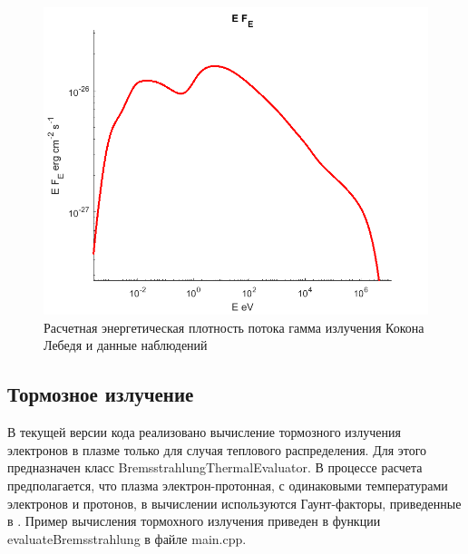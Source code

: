 \begin{figure}
	\centering
	\includegraphics[width=12.5 cm]{./fig/compton.png} 
	\caption{Расчетная энергетическая плотность потока гамма излучения Кокона Лебедя и данные наблюдений}
	\label{pion}
\end{figure}
\subsection{Тормозное излучение}
В текущей версии кода реализовано вычисление тормозного излучения электронов в плазме только для случая теплового распределения. Для этого предназначен класс BremsstrahlungThermalEvaluator. В процессе расчета предполагается, что плазма электрон-протонная, с одинаковыми температурами электронов и протонов, в вычислении используются Гаунт-факторы, приведенные в \cite{Rybicki}. Пример вычисления тормохного излучения приведен в функции evaluateBremsstrahlung в файле main.cpp.

